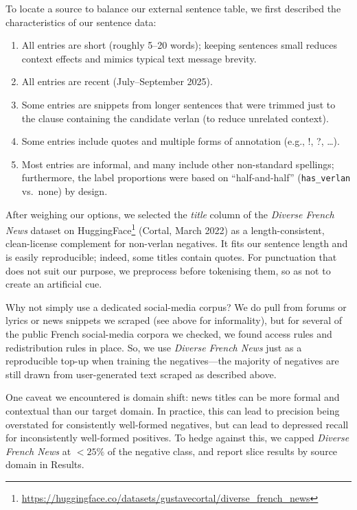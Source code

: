 \documentclass[12pt]{article}
\begin{document}
To locate a source to balance our external sentence table, we first described the characteristics of our sentence data:
\begin{enumerate}
  \item All entries are short (roughly 5--20 words); keeping sentences small reduces context effects and mimics typical text message brevity.
  \item All entries are recent (July--September 2025).
  \item Some entries are snippets from longer sentences that were trimmed just to the clause containing the candidate verlan (to reduce unrelated context).
  \item Some entries include quotes and multiple forms of annotation (e.g., !, ?, \ldots).
  \item Most entries are informal, and many include other non-standard spellings; furthermore, the label proportions were based on ``half-and-half'' (\texttt{has\_verlan} vs.\ none) by design.
\end{enumerate}

After weighing our options, we selected the \textit{title} column of the \textit{Diverse French News} dataset on HuggingFace\footnote{\url{https://huggingface.co/datasets/gustavecortal/diverse_french_news}} (Cortal, March 2022) as a length-consistent, clean-license complement for non-verlan negatives. It fits our sentence length and is easily reproducible; indeed, some titles contain quotes. For punctuation that does not suit our purpose, we preprocess before tokenising them, so as not to create an artificial cue.

Why not simply use a dedicated social-media corpus? We do pull from forums or lyrics or news snippets we scraped (see above for informality), but for several of the public French social-media corpora we checked, we found access rules and redistribution rules in place. So, we use \textit{Diverse French News} just as a reproducible top-up when training the negatives—the majority of negatives are still drawn from user-generated text scraped as described above.

One caveat we encountered is domain shift: news titles can be more formal and contextual than our target domain. In practice, this can lead to precision being overstated for consistently well-formed negatives, but can lead to depressed recall for inconsistently well-formed positives. To hedge against this, we capped \textit{Diverse French News} at \(<25\%\) of the negative class, and report slice results by source domain in Results.
\end{document}
